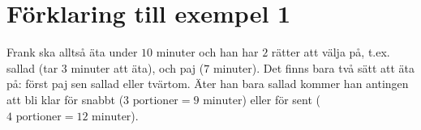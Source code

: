 \section*{Förklaring till exempel 1}
Frank ska alltså äta under $10$ minuter och han har $2$ rätter att välja på, t.ex. sallad (tar $3$ minuter att äta), och paj ($7$ minuter).
Det finns bara två sätt att äta på: först paj sen sallad eller tvärtom.
Äter han bara sallad kommer han antingen att bli klar för snabbt ($3 \text{ portioner} = 9 \text{ minuter}$) eller för sent ($4 \text{ portioner} = 12 \text{ minuter}$).
